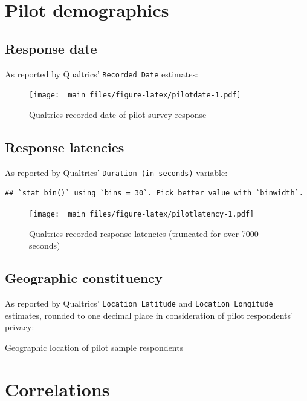 \documentclass[
]{book}
\begin{document}
\hypertarget{pilotdemo}{%
\chapter{Pilot demographics}\label{pilotdemo}}

\hypertarget{responsedate}{%
\section{Response date}\label{responsedate}}

As reported by Qualtrics' \texttt{Recorded\ Date} estimates:

\begin{figure}
\centering
\texttt{[image: \_main\_files/figure-latex/pilotdate-1.pdf]}
\caption{\label{fig:pilotdate}Qualtrics recorded date of pilot survey response}
\end{figure}

\hypertarget{response-latencies}{%
\section{Response latencies}\label{response-latencies}}

As reported by Qualtrics' \texttt{Duration\ (in\ seconds)} variable:

\begin{verbatim}
## `stat_bin()` using `bins = 30`. Pick better value with `binwidth`.
\end{verbatim}

\begin{figure}
\centering
\texttt{[image: \_main\_files/figure-latex/pilotlatency-1.pdf]}
\caption{\label{fig:pilotlatency}Qualtrics recorded response latencies (truncated for over 7000 seconds)}
\end{figure}

\hypertarget{geo}{%
\section{Geographic constituency}\label{geo}}

As reported by Qualtrics' \texttt{Location\ Latitude} and \texttt{Location\ Longitude} estimates, rounded to one decimal place in consideration of pilot respondents' privacy:

\hypertarget{htmlwidget-9e9231691e1b9f65e002}{}

\label{fig:geo}Geographic location of pilot sample respondents

\hypertarget{corrs}{%
\chapter{Correlations}\label{corrs}}
\end{document}
